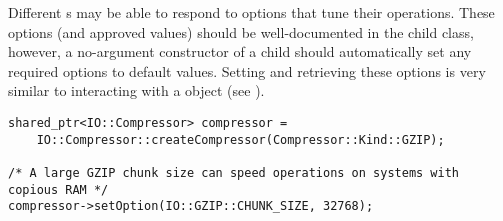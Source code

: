 Different s may be able to respond to options that tune their
operations.  These options (and approved values) should be well-documented
in the child class, however, a no-argument constructor of a child
 should automatically set any required options to default
values.  Setting and retrieving these options is very similar to interacting
with a  object (see ).

\begin{lstlisting}[caption={Setting \class{Compressor} Options}, label=lst:compressoroptions]
shared_ptr<IO::Compressor> compressor =
    IO::Compressor::createCompressor(Compressor::Kind::GZIP);

/* A large GZIP chunk size can speed operations on systems with copious RAM */
compressor->setOption(IO::GZIP::CHUNK_SIZE, 32768);

\end{lstlisting}
